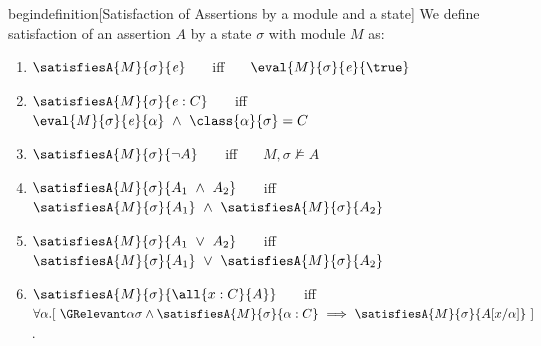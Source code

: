 begin{definition}[Satisfaction 
of Assertions by a module and a state] 
\label{def:chainmail-semantics}
We define satisfaction of an assertion $A$ by a %
state $\sigma$ with 
 module $M$ as:
\begin{enumerate}
\item
\label{cExpr}
$\satisfiesA{M}{\sigma}{{\re}}$ \ \ \ iff \ \ \  $\eval{M}{\sigma}{{\re}}{\true}$
\item
\label{cClass}
$\satisfiesA{M}{\sigma}{{{\re}} : C}$ \ \ \ iff \ \ \  $\eval{M}{\sigma}{{\re}}{\alpha}\   \wedge \ \class{\alpha} {\sigma}= C$
\item
$\satisfiesA{M}{\sigma}{\neg A}$ \ \ \ iff \ \ \  ${M},{\sigma}\nvDash{A}$
\item
$\satisfiesA{M}{\sigma}{A_1\ \wedge\ A_2}$ \ \ \ iff \ \ \  $\satisfiesA{M}{\sigma}{A_1} \   \wedge \ \satisfiesA{M}{\sigma}{A_2}$
\item
$\satisfiesA{M}{\sigma}{A_1\ \vee\ A_2}$ \ \ \ iff \ \ \  $\satisfiesA{M}{\sigma}{A_1}\   \vee \ \satisfiesA{M}{\sigma}{A_2}$

\item
\label{quant1}
$\satisfiesA{M}{\sigma}{\all{x:C}{A}}$ \ \ \ iff \ \ \  
 {$\forall \alpha.[\ \GRelevant \alpha \sigma \wedge  \satisfiesA {M}{\sigma} {\alpha:C}  \ \Longrightarrow   \ \satisfiesA{M}{\sigma} {A[x/\alpha]}\ ]$.} 


\end{enumerate}
